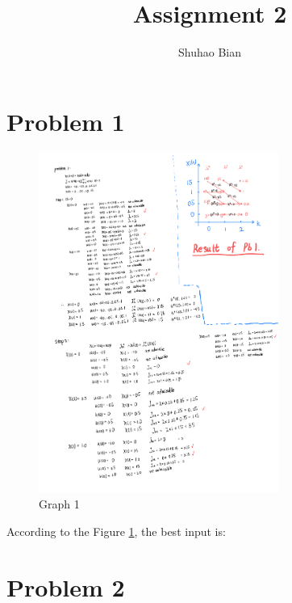 \documentclass{article}
\title{Assignment 2}
\author{Shuhao Bian}
\begin{document}
\maketitle

\section{Problem 1}

\begin{figure}[h!]
    \centering
    \includegraphics[width=0.7\textwidth]{graph 1.png}
    \caption{Graph 1}\label{fig:pb1graph1}
\end{figure}

According to the Figure \ref{fig:pb1graph1}, the best input is:

\section{Problem 2}
\end{document}
